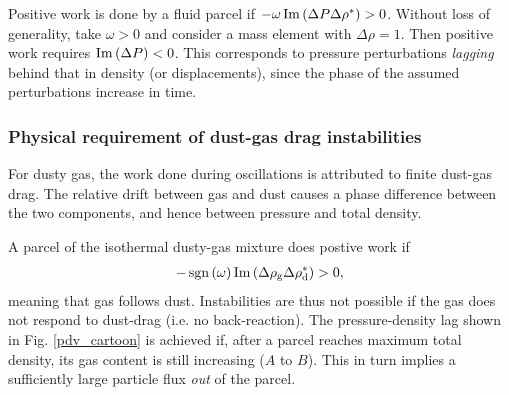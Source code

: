 Positive work is done by a fluid parcel if $-\omega \operatorname{Im}\left(\Delta  
P\Delta\rho^*\right)>0$. Without loss of generality, take $\omega>0$
and consider a mass element with $\Delta\rho = 1$. Then positive work 
requires $\operatorname{Im}\left(\Delta
P\right)<0$.  This corresponds to pressure perturbations \emph{lagging}
behind that in density (or displacements), since the phase of
the assumed perturbations increase in time.  


\subsubsection{Physical requirement of dust-gas drag instabilities}  





For dusty gas, the work done during oscillations 
 is attributed to finite dust-gas drag. The relative
drift between gas and dust causes a phase difference between the two
components, and hence between pressure and total density. 

A parcel of the isothermal dusty-gas mixture does 
postive work if  
\begin{align*}
-\operatorname{sgn}\left(\omega\right)\operatorname{Im}\left(\Delta\rho_\mathrm{g}\Delta\rho_\mathrm{d}^*\right)>0,
\end{align*}
meaning that gas follows dust. Instabilities are thus not possible if the
gas does not respond to dust-drag (i.e. no back-reaction). The
pressure-density lag shown in Fig. \ref{pdv_cartoon} is achieved if, 
after a parcel reaches maximum total density, its 
gas content is still increasing ($A$ to $B$). This in turn implies a sufficiently
large particle flux \emph{out} of the parcel.   

